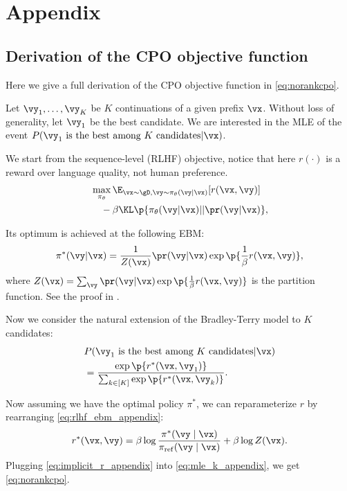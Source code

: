 \section{Appendix}
\subsection{Derivation of the CPO objective function}
Here we give a full derivation of the CPO objective function in \cref{eq:norankcpo}.

Let $\vy_1,\ldots,\vy_K$ be $K$ continuations of a given prefix $\vx$. Without loss of generality, let $\vy_1$ be the best candidate. We are interested in the MLE of the event $P(\vy_1 \text{ is the best among $K$ candidates}|\vx)$.

We start from the sequence-level (RLHF) objective, notice that here $r(\cdot)$ is a reward over language quality, not human preference.
\begin{align}
\begin{split}
		& \max_{\pi_\theta} \E_{\vx\sim\gD, \vy\sim\pi_\theta(\vy|\vx)}[r(\vx, \vy)] \\
		& \quad-\beta \KL\p{\pi_\theta(\vy|\vx)||\pr(\vy|\vx)},
\end{split}
\end{align}

Its optimum is achieved at the following EBM:
\begin{align}\label{eq:rlhf_ebm_appendix}
	\pi^*(\vy|\vx) = \frac{1}{Z(\vx)}\pr(\vy|\vx)\exp\p{\frac{1}{\beta}r(\vx,\vy)},
\end{align}
where $Z(\vx)=\sum_{\vy}\pr(\vy|\vx)\exp\p{\frac{1}{\beta}r(\vx,\vy)}$ is the partition function. See the proof in \cite{rafailov2023direct,korbak2022rl}.



Now we consider the natural extension of the Bradley-Terry model to $K$ candidates:
\begin{align}\label{eq:mle_k_appendix}
\begin{split}
	&P(\vy_1 \text{ is the best among $K$ candidates}|\vx)\\
	&=\frac{\exp\p{r^*(\vx, \vy_1)}}{\sum_{k\in[K]}\exp\p{r^*(\vx, \vy_k)}}.
\end{split}
\end{align}

Now assuming we have the optimal policy $\pi^*$, we can reparameterize $r$ by rearranging \cref{eq:rlhf_ebm_appendix}:
\begin{align}\label{eq:implicit_r_appendix}
\begin{split}
	r^*(\vx, \vy)=\beta \log \frac{\pi^*(\vy \mid \vx)}{\pi_{\mathrm{ref}}(\vy \mid \vx)}+\beta \log Z(\vx).
\end{split}
\end{align}
Plugging \cref{eq:implicit_r_appendix} into \cref{eq:mle_k_appendix}, we get \cref{eq:norankcpo}.

